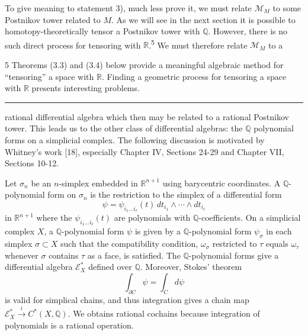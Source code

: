 \documentclass[
  english,
  a3paper,
  a3paper]{extarticle}
\begin{document}
To give meaning to statement 3), much less prove it, we must relate
\(\mathcal M_M\) to some Postnikov tower related to \(M\). As we will
see in the next section it is possible to homotopy-theoretically tensor
a Postnikov tower with \(\mathbb Q\). However, there is no such direct
process for tensoring with \(\mathbb R\).\textsuperscript{5} We must
therefore relate \(\mathcal M_M\) to a

5 Theorems (3.3) and (3.4) below provide a meaningful algebraic method
for ``tensoring'' a space with \(\mathbb R\). Finding a geometric
process for tensoring a space with \(\mathbb R\) presents interesting
problems.

\clearpage



\par

\vspace{0.7mm}\hrule\vspace{1.6mm}

\fontsize{9}{11}\selectfont

rational differential algebra which then may be related to a rational
Postnikov tower. This leads us to the other class of differential
algebras: the \(\mathbb Q\) polynomial forms on a simplicial complex.
The following discussion is motivated by Whitney's work {[}18{]},
especially Chapter IV, Sections 24-29 and Chapter VII, Sections 10-12.

Let \(\sigma_n\) be an \(n\)-simplex embedded in \(\mathbb R^{n+1}\)
using barycentric coordinates. A \(\mathbb Q\)-polynomial form on
\(\sigma_n\) is the restriction to the simplex of a differential form \[
\psi=\psi_{i_1\ldots i_\ell}(t)\,dt_{i_1}\wedge\cdots\wedge dt_{i_\ell}
\] in \(\mathbb R^{n+1}\) where the \(\psi_{i_1\ldots i_\ell}(t)\) are
polynomials with \(\mathbb Q\)-coefficients. On a simplicial complex
\(X\), a \(\mathbb Q\)-polynomial form \(\psi\) is given by a
\(\mathbb Q\)-polynomial form \(\psi_\sigma\) in each simplex
\(\sigma\subset X\) such that the compatibility condition,
\(\omega_\sigma\) restricted to \(\tau\) equals \(\omega_\tau\) whenever
\(\sigma\) contains \(\tau\) as a face, is satisfied. The
\(\mathbb Q\)-polynomial forms give a differential algebra
\(\mathscr E_X^*\) defined over \(\mathbb Q\). Moreover, Stokes' theorem
\[
\int_{\partial C}\psi=\int_Cd\psi
\] is valid for simplical chains, and thus integration gives a chain map
\(\mathscr E_X^*\xrightarrow{i}C^*(X,\mathbb Q)\). We obtains rational
cochains because integration of polynomials is a rational operation.
\end{document}

